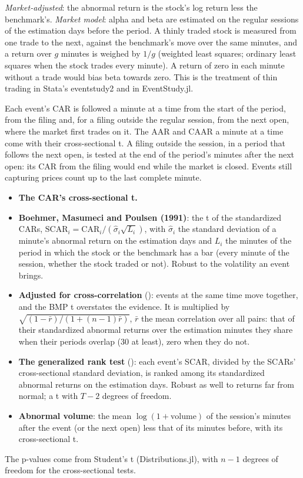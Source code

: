 \emph{Market-adjusted}: the abnormal return is the stock's log return less the benchmark's. \emph{Market model}: alpha
and beta are estimated on the regular sessions of the estimation days before the period. A thinly traded stock is
measured from one trade to the next, against the benchmark's move over the same minutes, and a return over $g$ minutes
is weighed by $1/g$ (weighted least squares; ordinary least squares when the stock trades every minute). A return of
zero in each minute without a trade would bias beta towards zero. This is the treatment of thin trading in Stata's
eventstudy2 and in EventStudy.jl.

Each event's CAR is followed a minute at a time from the start of the period, from the filing and, for a filing outside
the regular session, from the next open, where the market first trades on it. The AAR and CAAR a minute at a time come
with their cross-sectional t. A filing outside the session, in a period that follows the next open, is tested at the end
of the period's minutes after the next open: its CAR from the filing would end while the market is closed. Events
still capturing prices count up to the last complete minute.

\begin{itemize}
  \item \textbf{The CAR's cross-sectional t.}
  \item \textbf{Boehmer, Masumeci and Poulsen (1991)}: the t of the standardized CARs,
    $\mathrm{SCAR}_i = \mathrm{CAR}_i / (\hat\sigma_i \sqrt{L_i})$, with $\hat\sigma_i$ the standard deviation of a
    minute's abnormal return on the estimation days and $L_i$ the minutes of the period in which the stock or the
    benchmark has a bar (every minute of the session, whether the stock traded or not). Robust to the volatility an
    event brings.
  \item \textbf{Adjusted for cross-correlation} (): events at the same time
    move together, and the BMP t overstates the evidence. It is multiplied by $\sqrt{(1-\bar r)/(1+(n-1)\bar r)}$,
    $\bar r$ the mean correlation over all pairs: that of their standardized abnormal returns over the estimation
    minutes they share when their periods overlap (30 at least), zero when they do not.
  \item \textbf{The generalized rank test} (): each event's SCAR, divided by
    the SCARs' cross-sectional standard deviation, is ranked among its standardized abnormal returns on the estimation
    days. Robust as well to returns far from normal; a t with $T-2$ degrees of freedom.
  \item \textbf{Abnormal volume}: the mean $\log(1+\text{volume})$ of the session's minutes after the event (or the next
    open) less that of its minutes before, with its cross-sectional t.
\end{itemize}
The p-values come from Student's t (Distributions.jl), with $n-1$ degrees of freedom for the cross-sectional tests.

